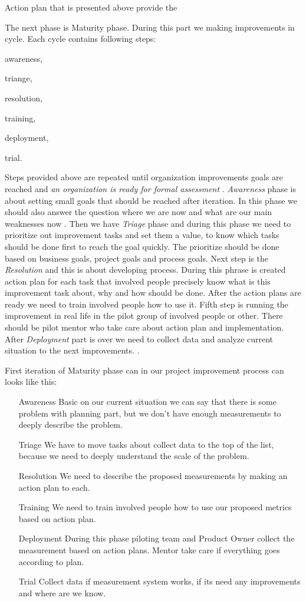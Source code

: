 Action plan that is presented above provide the 

The next phase is Maturity phase. During this part we making improvements in cycle. Each cycle contains following steps: 
\begin{inparaenum}
\item awareness,
\item triange,
\item resolution,
\item training,
\item deployment,
\item trial.
\end{inparaenum}
Steps provided above are repeated until organization improvements goals are reached and \textit{an organization is ready for formal assessment} \cite{jacobs_short}. \textit{Awareness} phase is about setting small goals that should be reached after iteration. In this phase we should also answer the question where we are now and what are our main weaknesses now \cite{jacobs} \cite{jacobs_short}. Then we have \textit{Triage} phase and during this phase we need to prioritize out improvement tasks and set them a value, to know which tasks should be done first to reach the goal quickly. The prioritize should be done based on business goals, project goals and process goals. Next step is the \textit{Resolution} and this is about developing process. During this phrase is created action plan for each task that involved people precisely know what is this improvement task about, why and how should be done. After the action plans are ready we need to train involved people how to use it. Fifth step is running the improvement in real life in the pilot group of involved people or other. There should be pilot mentor who take care about action plan and implementation. After \textit{Deployment} part is over we need to collect data and analyze current situation to the next improvements. \cite{jacobs} \cite{jacobs_short}.

First iteration of Maturity phase can in our project improvement process can looks like this:

\begin{enumerate}
\item[Awareness] Basic on our current situation we can say that there is some problem with planning part, but we don't have enough measurements to deeply describe the problem. 
\item[Triage] We have to move  tasks about collect data to the top of the list, because we need to deeply understand the scale of the problem.
\item[Resolution] We need to describe the proposed measurements by making an action plan to each.
\item[Training] We need to train involved people how to use our proposed metrics based on action plan.
\item[Deployment] During this phase piloting team and Product Owner collect the measurement based on action plans. Mentor take care if everything goes according to plan.
\item[Trial] Collect data if measurement system works, if its need any improvements and where are we know.
\end{enumerate}

